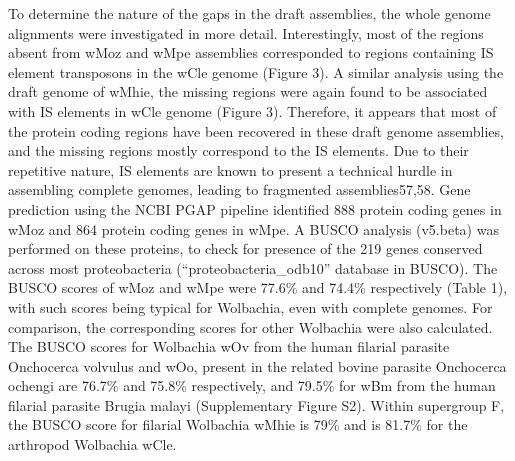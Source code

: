 \documentclass[10pt, a4paper, twocolumn]{article} %
\begin{document}
To determine the nature of the gaps in the draft assemblies, the whole genome alignments were investigated in more detail. Interestingly, most of the regions absent from wMoz and wMpe assemblies corresponded to regions containing IS element transposons in the wCle genome (Figure 3). A similar analysis using the draft genome of wMhie, the missing regions were again found to be associated with IS elements in wCle genome (Figure 3). Therefore, it appears that most of the protein coding regions have been recovered in these draft genome assemblies, and the missing regions mostly correspond to the IS elements. Due to their repetitive nature, IS elements are known to present a technical hurdle in assembling complete genomes, leading to fragmented assemblies57,58. 
Gene prediction using the NCBI PGAP pipeline identified 888 protein coding genes in wMoz and 864 protein coding genes in wMpe. A BUSCO analysis (v5.beta) was performed on these proteins, to check for presence of the 219 genes conserved across most proteobacteria (“proteobacteria\_odb10” database in BUSCO). The BUSCO scores of wMoz and wMpe were 77.6\% and 74.4\% respectively (Table 1), with such scores being typical for Wolbachia, even with complete genomes. For comparison, the corresponding scores for other Wolbachia were also calculated. The BUSCO scores for Wolbachia wOv from the human filarial parasite Onchocerca volvulus and wOo, present in the related bovine parasite Onchocerca ochengi are 76.7\% and 75.8\% respectively, and 79.5\% for wBm from the human filarial parasite Brugia malayi (Supplementary Figure S2). Within supergroup F, the BUSCO score for filarial Wolbachia wMhie is 79\% and is 81.7\% for the arthropod Wolbachia wCle. 
\end{document}
